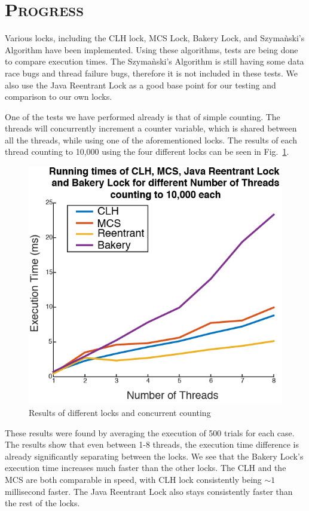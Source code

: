 \documentclass[CheckpointReport.tex]{subfiles}
\begin{document}
\bigskip

\section*{\textsc{\Large Progress}}
Various locks, including the CLH lock, MCS Lock, Bakery Lock, and Szyma\`{n}ski's Algorithm have been implemented.  Using these algorithms, tests are being done to compare execution times.  The Szyma\`{n}ski's Algorithm is still having some data race bugs and thread failure bugs, therefore it is not included in these tests.  We also use the Java Reentrant Lock as a good base point for our testing and comparison to our own locks.  

One of the tests we have performed already is that of simple counting.  The threads will concurrently increment a counter variable, which is shared between all the threads, while using one of the aforementioned locks.  The results of each thread counting to 10,000 using the four different locks can be seen in Fig.~\ref{fig:counting}.\\

\begin{figure}[H]
	\centering
	\includegraphics[scale = 1.1]{runningTime.png}
	\caption{Results of different locks and concurrent counting}\label{fig:counting}
\end{figure}

These results were found by averaging the execution of 500 trials for each case.  The results show that even between 1-8 threads, the execution time difference is already significantly separating between the locks.  We see that the Bakery Lock's execution time increases much faster than the other locks.  The CLH and the MCS are both comparable in speed, with CLH lock consistently being $\sim1$ millisecond faster.  The Java Reentrant Lock also stays consistently faster than the rest of the locks.
\end{document}
